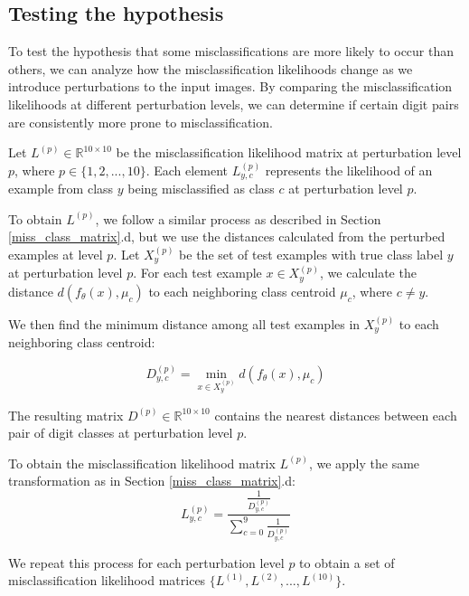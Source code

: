 

\subsection{Testing the hypothesis}

To test the hypothesis that some misclassifications are more likely to occur than others, we can analyze how the misclassification likelihoods change as we introduce perturbations to the input images. By comparing the misclassification likelihoods at different perturbation levels, we can determine if certain digit pairs are consistently more prone to misclassification.

Let $L^{(p)} \in \mathbb{R}^{10 \times 10}$ be the misclassification likelihood matrix at perturbation level $p$, where $p \in \{1, 2, ..., 10\}$. Each element $L^{(p)}_{y,c}$ represents the likelihood of an example from class $y$ being misclassified as class $c$ at perturbation level $p$.

To obtain $L^{(p)}$, we follow a similar process as described in Section \ref{miss_class_matrix}.d, but we use the distances calculated from the perturbed examples at level $p$. Let $X^{(p)}_y$ be the set of test examples with true class label $y$ at perturbation level $p$. For each test example $x \in X^{(p)}_y$, we calculate the distance $d(f_\theta(x), \mu_c)$ to each neighboring class centroid $\mu_c$, where $c \neq y$.

We then find the minimum distance among all test examples in $X^{(p)}_y$ to each neighboring class centroid:

\begin{equation}
D^{(p)}_{y,c} = \min_{x \in X^{(p)}_y} d(f_\theta(x), \mu_c)    
\end{equation}

The resulting matrix $D^{(p)} \in \mathbb{R}^{10 \times 10}$ contains the nearest distances between each pair of digit classes at perturbation level $p$.

To obtain the misclassification likelihood matrix $L^{(p)}$, we apply the same transformation as in Section \ref{miss_class_matrix}.d:
\begin{equation}
L^{(p)}_{y,c} = \frac{\frac{1}{D^{(p)}_{y,c}}}{\sum\limits_{c=0}^9 \frac{1}{D^{(p)}_{y,c}}}    
\end{equation}

We repeat this process for each perturbation level $p$ to obtain a set of misclassification likelihood matrices $\{L^{(1)}, L^{(2)}, ..., L^{(10)}\}$.

